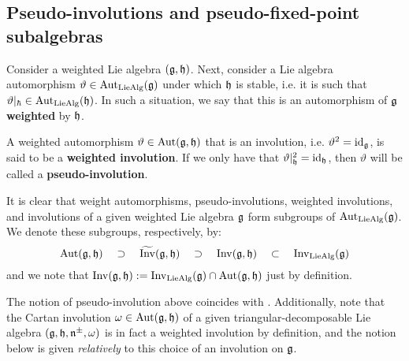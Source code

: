     \subsection{Pseudo-involutions and pseudo-fixed-point subalgebras}
        \begin{definition} \label{def: weighted_automorphisms_of_weighted_lie_algebras}
            Consider a weighted Lie algebra $(\mathfrak{g}, \mathfrak{h})$. Next, consider a Lie algebra automorphism $\vartheta \in \operatorname{Aut}_{\mathrm{Lie}\mathrm{Alg}}(\mathfrak{g})$ under which $\mathfrak{h}$ is stable, i.e. it is such that $\vartheta|_{\hbar} \in \operatorname{Aut}_{\mathrm{Lie}\mathrm{Alg}}(\mathfrak{h})$. In such a situation, we say that this is an automorphism of $\mathfrak{g}$ \textbf{weighted} by $\mathfrak{h}$.
            
            A weighted automorphism $\vartheta \in \operatorname{Aut}(\mathfrak{g}, \mathfrak{h})$ that is an involution, i.e. $\vartheta^2 = \mathrm{id}_{\mathfrak{g}}$, is said to be a \textbf{weighted involution}. If we only have that $\vartheta|_{\mathfrak{h}}^2 = \mathrm{id}_{\mathfrak{h}}$, then $\vartheta$ will be called a \textbf{pseudo-involution}. 
        \end{definition}
        It is clear that weight automorphisms, pseudo-involutions, weighted involutions, and involutions of a given weighted Lie algebra $\mathfrak{g}$ form subgroups of $\operatorname{Aut}_{\mathrm{Lie}\mathrm{Alg}}(\mathfrak{g})$. We denote these subgroups, respectively, by:
            $$\operatorname{Aut}(\mathfrak{g}, \mathfrak{h}) \quad \supset \quad \widetilde{\operatorname{Inv}}(\mathfrak{g}, \mathfrak{h}) \quad \supset \quad \operatorname{Inv}(\mathfrak{g}, \mathfrak{h}) \quad \subset \quad \operatorname{Inv}_{\mathrm{Lie}\mathrm{Alg}}(\mathfrak{g})$$
        and we note that $\operatorname{Inv}(\mathfrak{g}, \mathfrak{h}) := \operatorname{Inv}_{\mathrm{Lie}\mathrm{Alg}}(\mathfrak{g}) \cap \operatorname{Aut}(\mathfrak{g}, \mathfrak{h})$ just by definition.
        \begin{remark}
            The notion of pseudo-involution above coincides with \cite[Definition 1.1]{regelskis_vlaar_kac_moody_pseudo_symmetric_pairs}. Additionally, note that the Cartan involution $\omega \in \operatorname{Aut}(\mathfrak{g}, \mathfrak{h})$ of a given triangular-decomposable Lie algebra $(\mathfrak{g}, \mathfrak{h}, \mathfrak{n}^{\pm}, \omega)$ is in fact a weighted involution by definition, and the notion below is given \textit{relatively} to this choice of an involution on $\mathfrak{g}$.
        \end{remark}
        
